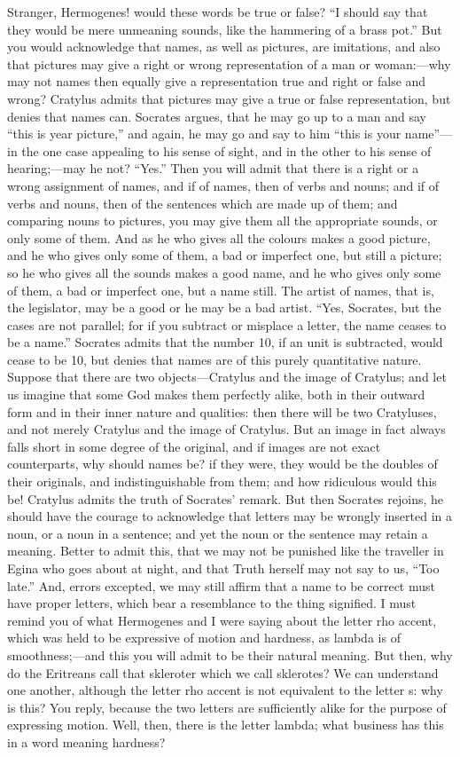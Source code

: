 \documentclass[11pt,letter]{article}
\begin{document}
Stranger, Hermogenes! would these words be true or false? “I should say that they would be mere unmeaning sounds, like the hammering of a brass pot.” But you would acknowledge that names, as well as pictures, are imitations, and also that pictures may give a right or wrong representation of a man or woman:—why may not names then equally give a representation true and right or false and wrong? Cratylus admits that pictures may give a true or false representation, but denies that names can. Socrates argues, that he may go up to a man and say “this is year picture,” and again, he may go and say to him “this is your name”—in the one case appealing to his sense of sight, and in the other to his sense of hearing;—may he not? “Yes.” Then you will admit that there is a right or a wrong assignment of names, and if of names, then of verbs and nouns; and if of verbs and nouns, then of the sentences which are made up of them; and comparing nouns to pictures, you may give them all the appropriate sounds, or only some of them. And as he who gives all the colours makes a good picture, and he who gives only some of them, a bad or imperfect one, but still a picture; so he who gives all the sounds makes a good name, and he who gives only some of them, a bad or imperfect one, but a name still. The artist of names, that is, the legislator, may be a good or he may be a bad artist. “Yes, Socrates, but the cases are not parallel; for if you subtract or misplace a letter, the name ceases to be a name.” Socrates admits that the number 10, if an unit is subtracted, would cease to be 10, but denies that names are of this purely quantitative nature. Suppose that there are two objects—Cratylus and the image of Cratylus; and let us imagine that some God makes them perfectly alike, both in their outward form and in their inner nature and qualities: then there will be two Cratyluses, and not merely Cratylus and the image of Cratylus. But an image in fact always falls short in some degree of the original, and if images are not exact counterparts, why should names be? if they were, they would be the doubles of their originals, and indistinguishable from them; and how ridiculous would this be! Cratylus admits the truth of Socrates’ remark. But then Socrates rejoins, he should have the courage to acknowledge that letters may be wrongly inserted in a noun, or a noun in a sentence; and yet the noun or the sentence may retain a meaning. Better to admit this, that we may not be punished like the traveller in Egina who goes about at night, and that Truth herself may not say to us, “Too late.” And, errors excepted, we may still affirm that a name to be correct must have proper letters, which bear a resemblance to the thing signified. I must remind you of what Hermogenes and I were saying about the letter rho accent, which was held to be expressive of motion and hardness, as lambda is of smoothness;—and this you will admit to be their natural meaning. But then, why do the Eritreans call that skleroter which we call sklerotes? We can understand one another, although the letter rho accent is not equivalent to the letter s: why is this? You reply, because the two letters are sufficiently alike for the purpose of expressing motion. Well, then, there is the letter lambda; what business has this in a word meaning hardness? 
\end{document}
